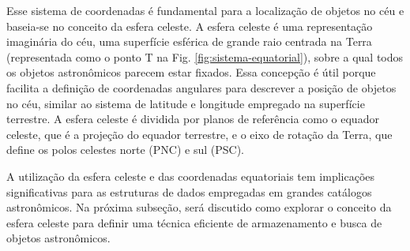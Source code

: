 Esse sistema de coordenadas é fundamental para a localização de objetos no céu e baseia-se no conceito da esfera celeste. A esfera celeste é uma representação imaginária do céu, uma superfície esférica de grande raio centrada na Terra (representada como o ponto T na Fig. \ref{fig:sistema-equatorial}), sobre a qual todos os objetos astronômicos parecem estar fixados. Essa concepção é útil porque facilita a definição de coordenadas angulares para descrever a posição de objetos no céu, similar ao sistema de latitude e longitude empregado na superfície terrestre. A esfera celeste é dividida por planos de referência como o equador celeste, que é a projeção do equador terrestre, e o eixo de rotação da Terra, que define os polos celestes norte (PNC) e sul (PSC).

A utilização da esfera celeste e das coordenadas equatoriais tem implicações significativas para as estruturas de dados empregadas em grandes catálogos astronômicos. Na próxima subseção, será discutido como explorar o conceito da esfera celeste para definir uma técnica eficiente de armazenamento e busca de objetos astronômicos.







